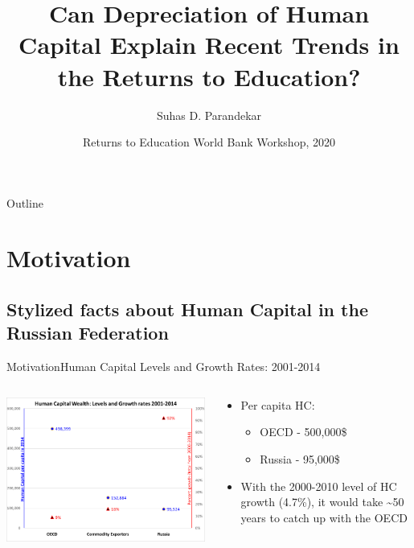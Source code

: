 \documentclass{beamer}
\title[Depreciation and Returns to Education] 
{Can Depreciation of Human Capital Explain Recent Trends in the Returns to Education?}
\author{Suhas D. Parandekar}
\date[WB Workshop, 2020]{Returns to Education World Bank Workshop, 2020}
\begin{document}
	
\begin{frame}
	\titlepage
\end{frame}

\begin{frame}{Outline}
	\tableofcontents
\end{frame}
	
\section{Motivation}
	\subsection{Stylized facts about Human Capital in the Russian Federation}

\begin{frame}{Motivation}{Human Capital Levels and Growth Rates: 2001-2014}
\begin{center}
\begin{columns}	
\begin{column}{.6\linewidth}
	\centering
	\includegraphics[]{graph_1a.png}
\end{column}
\begin{column}{.4\linewidth}
     \begin{itemize}
        	\item
           	Per capita HC:
        	\begin{itemize}
         		\item OECD - 500,000\$
          		\item Russia -  95,000\$
          	\end{itemize}
          	\item
          	With the 2000-2010 level of HC growth (4.7\%), it would take \textasciitilde 50 years to catch up with the OECD
     \end{itemize}
\end{column}
\end{columns}
\end{center}
\end{frame}
\end{document}
